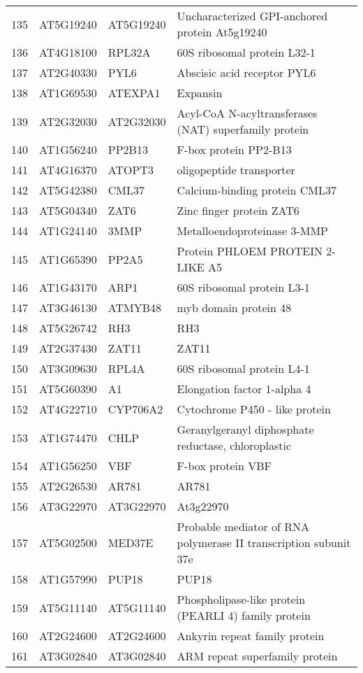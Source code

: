 \documentclass[a4paper]{article}
\begin{document}
\begin{center}
\begin{tabular}{rlll}
135 & AT5G19240 & AT5G19240 & Uncharacterized GPI-anchored protein At5g19240\\
136 & AT4G18100 & RPL32A & 60S ribosomal protein L32-1\\
137 & AT2G40330 & PYL6 & Abscisic acid receptor PYL6\\
138 & AT1G69530 & ATEXPA1 & Expansin\\
139 & AT2G32030 & AT2G32030 & Acyl-CoA N-acyltransferases (NAT) superfamily protein\\
140 & AT1G56240 & PP2B13 & F-box protein PP2-B13\\
141 & AT4G16370 & ATOPT3 & oligopeptide transporter\\
142 & AT5G42380 & CML37 & Calcium-binding protein CML37\\
143 & AT5G04340 & ZAT6 & Zinc finger protein ZAT6\\
144 & AT1G24140 & 3MMP & Metalloendoproteinase 3-MMP\\
145 & AT1G65390 & PP2A5 & Protein PHLOEM PROTEIN 2-LIKE A5\\
146 & AT1G43170 & ARP1 & 60S ribosomal protein L3-1\\
147 & AT3G46130 & ATMYB48 & myb domain protein 48\\
148 & AT5G26742 & RH3 & RH3\\
149 & AT2G37430 & ZAT11 & ZAT11\\
150 & AT3G09630 & RPL4A & 60S ribosomal protein L4-1\\
151 & AT5G60390 & A1 & Elongation factor 1-alpha 4\\
152 & AT4G22710 & CYP706A2 & Cytochrome P450 - like protein\\
153 & AT1G74470 & CHLP & Geranylgeranyl diphosphate reductase, chloroplastic\\
154 & AT1G56250 & VBF & F-box protein VBF\\
155 & AT2G26530 & AR781 & AR781\\
156 & AT3G22970 & AT3G22970 & At3g22970\\
157 & AT5G02500 & MED37E & Probable mediator of RNA polymerase II transcription subunit 37e\\
158 & AT1G57990 & PUP18 & PUP18\\
159 & AT5G11140 & AT5G11140 & Phospholipase-like protein (PEARLI 4) family protein\\
160 & AT2G24600 & AT2G24600 & Ankyrin repeat family protein\\
161 & AT3G02840 & AT3G02840 & ARM repeat superfamily protein\\

\end{tabular}
\end{center}
\end{document}
